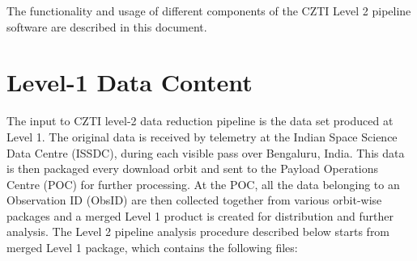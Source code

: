 \documentclass[11pt,oneside,a4paper]{article}
\begin{document}
\noindent The functionality  and usage of  different components of the CZTI    Level   2   pipeline    
software  are  described   in  this    document.


\section{Level-1 Data Content}

The  input to  CZTI level-2 data reduction pipeline is  the  data set  produced   at   Level   1.     The
original data  is received by telemetry at the Indian Space Science Data Centre (ISSDC), during each 
visible pass over Bengaluru, India.  This data is then packaged every download orbit and sent to the 
Payload Operations Centre (POC) for further processing.    At the POC, all the data belonging to an 
Observation ID (ObsID) are then collected together from various orbit-wise packages and a merged
Level 1 product is created for distribution and further analysis.  The Level 2 pipeline analysis procedure 
described below starts from merged Level 1 package, which contains the following files:
\end{document}
